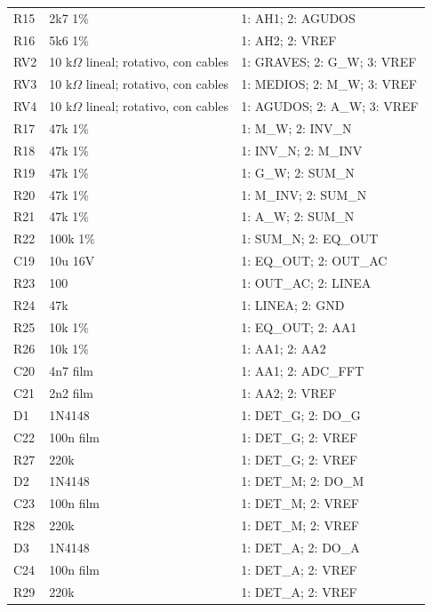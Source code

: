 \begin{longtable}{l p{44mm} p{96mm}}
R15 & 2k7 1\% & 1: AH1; 2: AGUDOS\\
R16 & 5k6 1\% & 1: AH2; 2: VREF\\
RV2 & 10 k\ensuremath{\Omega} lineal; rotativo, con cables & 1: GRAVES; 2: G\_W; 3: VREF\\
RV3 & 10 k\ensuremath{\Omega} lineal; rotativo, con cables & 1: MEDIOS; 2: M\_W; 3: VREF\\
RV4 & 10 k\ensuremath{\Omega} lineal; rotativo, con cables & 1: AGUDOS; 2: A\_W; 3: VREF\\
R17 & 47k 1\% & 1: M\_W; 2: INV\_N\\
R18 & 47k 1\% & 1: INV\_N; 2: M\_INV\\
R19 & 47k 1\% & 1: G\_W; 2: SUM\_N\\
R20 & 47k 1\% & 1: M\_INV; 2: SUM\_N\\
R21 & 47k 1\% & 1: A\_W; 2: SUM\_N\\
R22 & 100k 1\% & 1: SUM\_N; 2: EQ\_OUT\\
C19 & 10u 16V & 1: EQ\_OUT; 2: OUT\_AC\\
R23 & 100 & 1: OUT\_AC; 2: LINEA\\
R24 & 47k & 1: LINEA; 2: GND\\
R25 & 10k 1\% & 1: EQ\_OUT; 2: AA1\\
R26 & 10k 1\% & 1: AA1; 2: AA2\\
C20 & 4n7 film & 1: AA1; 2: ADC\_FFT\\
C21 & 2n2 film & 1: AA2; 2: VREF\\
D1 & 1N4148 & 1: DET\_G; 2: DO\_G\\
C22 & 100n film & 1: DET\_G; 2: VREF\\
R27 & 220k & 1: DET\_G; 2: VREF\\
D2 & 1N4148 & 1: DET\_M; 2: DO\_M\\
C23 & 100n film & 1: DET\_M; 2: VREF\\
R28 & 220k & 1: DET\_M; 2: VREF\\
D3 & 1N4148 & 1: DET\_A; 2: DO\_A\\
C24 & 100n film & 1: DET\_A; 2: VREF\\
R29 & 220k & 1: DET\_A; 2: VREF\\
\bottomrule\end{longtable}
